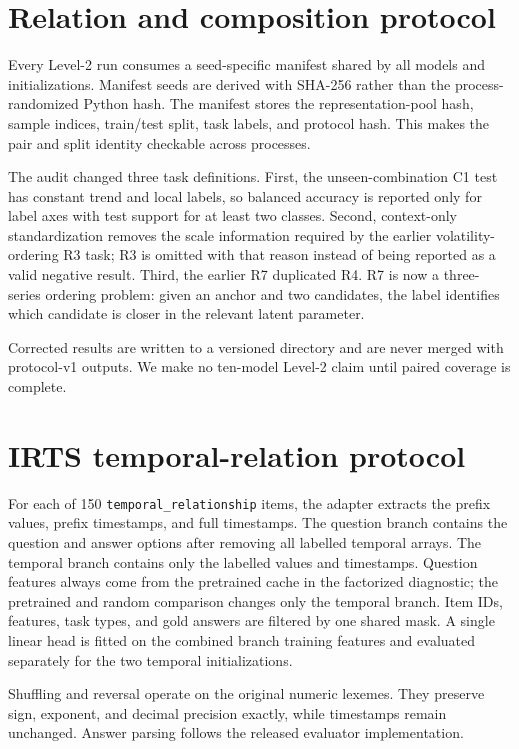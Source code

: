 \documentclass{article}
\begin{document}
\section{Relation and composition protocol}

Every Level-2 run consumes a seed-specific manifest shared by all models and
initializations.  Manifest seeds are derived with SHA-256 rather than the
process-randomized Python hash.  The manifest stores the representation-pool
hash, sample indices, train/test split, task labels, and protocol hash.  This
makes the pair and split identity checkable across processes.

The audit changed three task definitions.  First, the unseen-combination C1
test has constant trend and local labels, so balanced accuracy is reported only
for label axes with test support for at least two classes.  Second, context-only
standardization removes the scale information required by the earlier
volatility-ordering R3 task; R3 is omitted with that reason instead of being
reported as a valid negative result.  Third, the earlier R7 duplicated R4.  R7
is now a three-series ordering problem: given an anchor and two candidates, the
label identifies which candidate is closer in the relevant latent parameter.

Corrected results are written to a versioned directory and are never merged
with protocol-v1 outputs.  We make no ten-model Level-2 claim until paired
coverage is complete.

\section{IRTS temporal-relation protocol}

For each of 150 \texttt{temporal\_relationship} items, the adapter extracts the
prefix values, prefix timestamps, and full timestamps.  The question branch
contains the question and answer options after removing all labelled temporal
arrays.  The temporal branch contains only the labelled values and timestamps.
Question features always come from the pretrained cache in the factorized
diagnostic; the pretrained and random comparison changes only the temporal
branch.  Item IDs, features, task types, and gold answers are filtered by one
shared mask.  A single linear head is fitted on the combined branch training
features and evaluated separately for the two temporal initializations.

Shuffling and reversal operate on the original numeric lexemes.  They preserve
sign, exponent, and decimal precision exactly, while timestamps remain
unchanged.  Answer parsing follows the released evaluator implementation.
\end{document}
